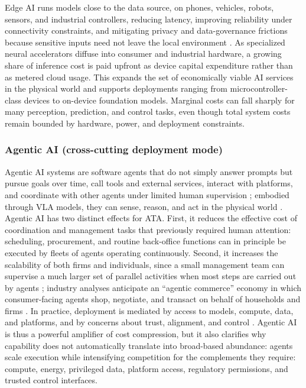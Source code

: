 \documentclass[11pt]{article}
\begin{document}
Edge AI runs models close to the data source, on phones, vehicles, robots, sensors, and industrial controllers, reducing latency, improving reliability under connectivity constraints, and mitigating privacy and data-governance frictions because sensitive inputs need not leave the local environment \citep{Singh2023EdgeAI}. As specialized neural accelerators diffuse into consumer and industrial hardware, a growing share of inference cost is paid upfront as device capital expenditure rather than as metered cloud usage. This expands the set of economically viable AI services in the physical world and supports deployments ranging from microcontroller-class devices to on-device foundation models. Marginal costs can fall sharply for many perception, prediction, and control tasks, even though total system costs remain bounded by hardware, power, and deployment constraints.

\subsubsection{Agentic AI (cross-cutting deployment mode)}\label{subsec:agentic}

Agentic AI systems are software agents that do not simply answer prompts but pursue goals over time, call tools and external services, interact with platforms, and coordinate with other agents under limited human supervision \citep{Xi2025LLMAgents}; embodied through VLA models, they can sense, reason, and act in the physical world \citep{Kawaharazuka2025VLA}. Agentic AI has two distinct effects for ATA. First, it reduces the effective cost of coordination and management tasks that previously required human attention: scheduling, procurement, and routine back-office functions can in principle be executed by fleets of agents operating continuously. Second, it increases the scalability of both firms and individuals, since a small management team can supervise a much larger set of parallel activities when most steps are carried out by agents \citep{HadfieldKoh2025Agents, TanHuang2025AgentEconomy}; industry analyses anticipate an ``agentic commerce'' economy in which consumer-facing agents shop, negotiate, and transact on behalf of households and firms \citep{McKinsey2025AgenticCommerce, Citi2025AgenticAI}. In practice, deployment is mediated by access to models, compute, data, and platforms, and by concerns about trust, alignment, and control \citep{Sastry2024ComputeGovernance, Papagiannidis2025ResponsibleAIGovernance, Ngo2024AlignmentDeepLearning}. Agentic AI is thus a powerful amplifier of cost compression, but it also clarifies why capability does not automatically translate into broad-based abundance: agents scale execution while intensifying competition for the complements they require: compute, energy, privileged data, platform access, regulatory permissions, and trusted control interfaces.
\end{document}
